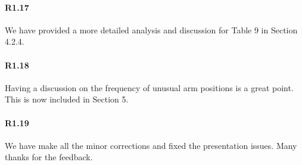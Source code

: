 \paragraph{R1.17} We have provided a more detailed analysis and discussion for Table 9 in Section 4.2.4.

\paragraph{R1.18} Having a discussion on the frequency of unusual arm positions is a great point. This is now included in Section 5.

\paragraph{R1.19} We have make all the minor corrections and fixed the presentation issues. Many thanks for the feedback.

